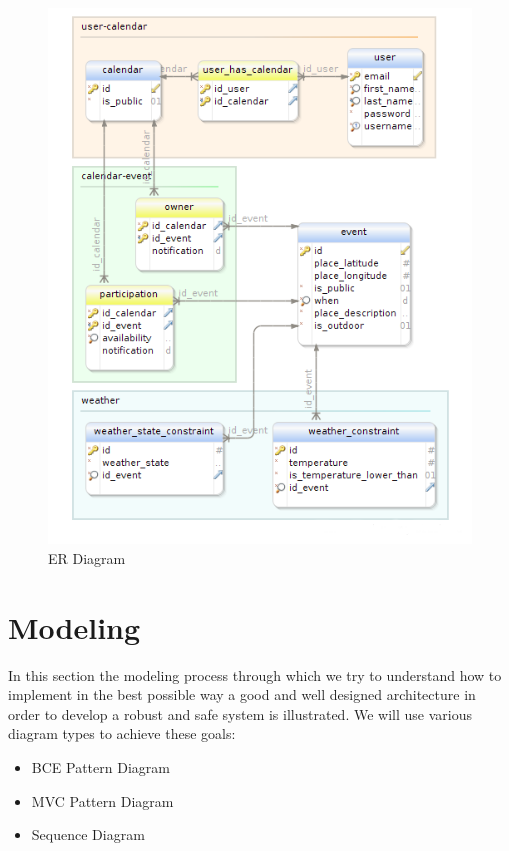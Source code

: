  \begin{center}
 \begin{figure}[!hbp]
    \includegraphics[width=1\textwidth]{./ERDiagram/er/er.png}
    \caption{ER Diagram}
     \label{fig:er}
     \end{figure}
   \end{center}  
\section{Modeling}
In this section the modeling process through which we try to understand how to implement in the best possible way a good and well designed architecture in order to develop a robust and safe system is illustrated. We will use various diagram types to achieve these goals: \begin{itemize}
\item BCE Pattern Diagram
\item MVC Pattern Diagram
\item Sequence Diagram
\end{itemize}
